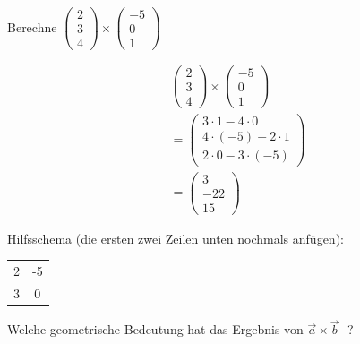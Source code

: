 \begin{frage}Berechne  $\left(\begin{array}{c} 2 \\ 3 \\ 4\end{array} \right) \times \left(\begin{array}{c} -5 \\ 0 \\ 1\end{array} \right)$\end{frage}
\begin{antwort}\begin{align*}
	&\left(\begin{array}{c} 2 \\ 3 \\ 4\end{array} \right) \times \left(\begin{array}{c} -5 \\ 0 \\ 1\end{array} \right) \\
	&= \left(\begin{array}{c} 3 \cdot 1 - 4 \cdot 0 \\ 4 \cdot (-5) - 2 \cdot 1 \\ 2 \cdot 0 - 3 \cdot (-5)\end{array} \right)\\
	&=\left(\begin{array}{c} 3 \\ -22 \\ 15\end{array} \right)
	\end{align*}
	
	Hilfsschema (die ersten zwei Zeilen unten nochmals anfügen):
	\begin{center}
	\begin{tabular}{cc}
	2 & -5 \\
	3 & 0
	\end{tabular}
	\end{center}\end{antwort}
\begin{frage}Welche geometrische Bedeutung hat das Ergebnis von $\vec{a}\times\vec{b}\textbf{ }$?\end{frage}

